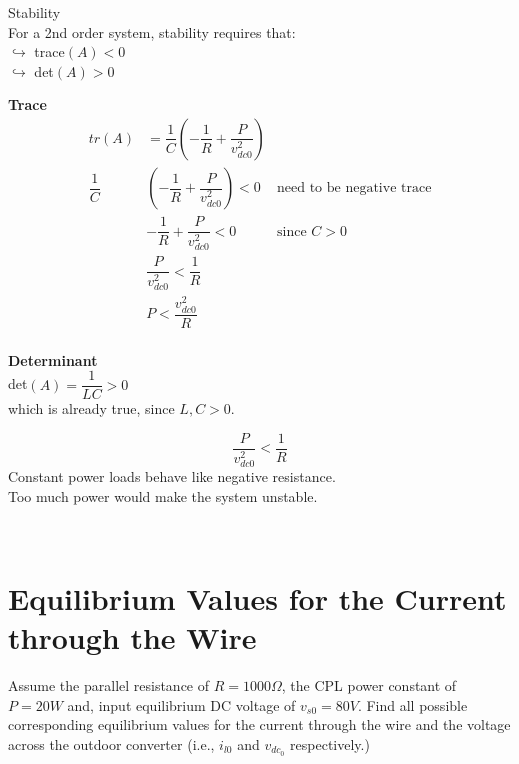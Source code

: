 \documentclass[12pt]{article}
\begin{document}
\begin{tcolorbox}[enhanced, frame hidden, colback=white, borderline west={1pt}{0pt}{gray}]
  \large{Stability}\\
  \normalsize{}
  For a 2nd order system, stability requires that:\\
  $\hookrightarrow$ trace$(A) < 0$\\
  $\hookrightarrow$ det$(A) > 0$
  \begin{tcolorbox}[enhanced, frame hidden, colback=white, borderline west={1pt}{0pt}{gray}]
    \textbf{Trace}\\
    \begin{align*}
      tr(A) &= \dfrac{1}{C}(-\dfrac{1}{R}+\dfrac{P}{v^2_{dc0}})\\
      \dfrac{1}{C}&(-\dfrac{1}{R}+\dfrac{P}{v^2_{dc0}}) < 0 & \text{need to be negative trace}\\
      &-\dfrac{1}{R}+\dfrac{P}{v^2_{dc0}} < 0 & \text{since } C > 0\\
      &\dfrac{P}{v^2_{dc0}} < \dfrac{1}{R}\\
      &P < \dfrac{v^2_{dc0}}{R}\\
    \end{align*}
  \end{tcolorbox}
  \begin{tcolorbox}[enhanced, frame hidden, colback=white, borderline west={1pt}{0pt}{gray}]
    \textbf{Determinant}\\

    det$(A) = \dfrac{1}{LC} > 0$\\

    which is already true, since $L, C > 0$.
  \end{tcolorbox}


  \[
    \boxed{
      \dfrac{P}{v^2_{dc0}} < \dfrac{1}{R}
    }
  \]
  Constant power loads behave like negative resistance. \\
  Too much power would make the system unstable.
\end{tcolorbox}

\

\section{Equilibrium Values for the Current through the Wire}
Assume the parallel resistance of $R = 1000\Omega$, the CPL power constant of $P = 20W$ and, input equilibrium DC voltage of $v_{s0} = 80V$. Find all possible corresponding equilibrium values for the current through the wire and the voltage across the outdoor converter (i.e., $i_{l0}$ and $v_{dc_0}$ respectively.)\\
\end{document}
